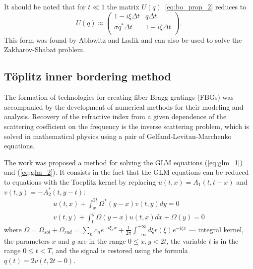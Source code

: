 It should be noted that for $ t \ll 1 $ the matrix $ U (q) $~\ref{eq:bo_prop_2} reduces to
\begin{equation}
    U(q) \approx
    \begin{pmatrix}
        1 - i\xi \Delta t & q \Delta t \\
        \sigma q^{*} \Delta t & 1 + i \xi \Delta t \\
    \end{pmatrix} {.}
\end{equation}
This form was found by Ablowitz and Ladik \cite{ablowitz1975, ablowitz1976} and can also be used to solve the Zakharov-Shabat problem.


\subsection{T\"oplitz inner bordering method}

The formation of technologies for creating fiber Bragg gratings (FBGs) \cite{agrawal2002, kashyap1999} was accompanied by the development of numerical methods for their modeling and analysis. Recovery of the refractive index from a given dependence of the scattering coefficient on the frequency is the inverse scattering problem, which is solved in mathematical physics using a pair of Gelfand-Levitan-Marchenko \cite{zakharov1972exact} equations.

The work \cite{belai2007} was proposed a method for solving the GLM equations (\ref{eq:glm_1}) and (\ref{eq:glm_2}). It consists in the fact that the GLM equations can be reduced to equations with the Toeplitz kernel by replacing $u(t,x) = A_1(t,t-x)$ and $v(t,y) = -A^{*}_2(t,y-t)$:
\begin{eqnarray}
    u(t,x)+\int_{x}^{2t} \Omega^{*}(y-x) v(t,y) dy = 0 \nonumber \\
    v(t,y)+\int_{0}^{y} \Omega(y-x) u(t,x) dx + \Omega(y) = 0
    \label{eq:glm_tib}
\end{eqnarray}
where $\Omega = \Omega_{sol} + \Omega_{rad} =  \sum_{n} c_n e^{-i \xi_n x} +
\frac{1}{2\pi} \int_{-\infty}^{+\infty} d\xi r(\xi) e^{-i \xi x}$ --- integral kernel, 
the parameters $ x $ and $ y $ are in the range $ 0 \leq x {,} y <2t $, the variable $ t $ is in the range $ 0 \leq t <T $, and the signal is restored using the formula $ q (t) = 2 v (t, 2t-0) $.

